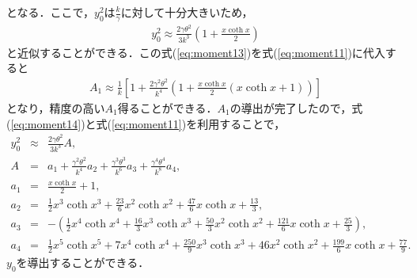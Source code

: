 となる．ここで，$y_0^2$は$\frac{k}{\gamma}$に対して十分大きいため，
\begin{eqnarray}
\label{eq:moment13}
y_0^2 \approx \frac{2\gamma\theta^2}{3k^3}\left(1+\frac{x \coth x}{2}\right)
\end{eqnarray}
と近似することができる．この式(\ref{eq:moment13})を式(\ref{eq:moment11})に代入すると
\begin{eqnarray}
\label{eq:moment14}
A_1\approx\frac{1}{k}\left[ 1+ \frac{2\gamma^2\theta^2}{k^4}\left(1+\frac{x\coth x}{2}(x \coth x + 1)\right)\right]
\end{eqnarray}
となり，精度の高い$A_1$得ることができる．$A_1$の導出が完了したので，式(\ref{eq:moment14})と式(\ref{eq:moment11})を利用することで，
\begin{eqnarray}
\label{eq:moment15}
y_0^2&\approx &\frac{2\gamma\theta^2}{3k^3}A,\\
A&=&a_1
+\frac{\gamma^2 \theta^2}{k^4}a_2
+\frac{\gamma^3 \theta^3}{k^6}a_3
+\frac{\gamma^4 \theta^4}{k^8}a_4,\nonumber \\
a_1&=&\frac{x \coth x}{2}+1,\nonumber \\
a_2&=&\frac{1}{2}x^3 \coth x^3
+\frac {23}{6} x^2 \coth x^2
+\frac {47}{6}x \coth x
+\frac{13}{3},\nonumber \\
a_3&=&-\left(
\frac{1}{2}x^4 \coth x^4
+\frac{16}{3}x^3 \coth x^3
+\frac{50}{3}x^2 \coth x^2
+\frac{121}{6}x \coth x
+\frac{25}{3}
\right),\nonumber \\
a_4&=&
\frac{1}{2}x^5 \coth x^5
+7x^4 \coth x^4
+\frac{250}{9}x^3 \coth x^3
+46x^2 \coth x^2
+\frac{199}{6}x \coth x
+\frac{77}{9}.\nonumber
\end{eqnarray}
$y_0$を導出することができる．
